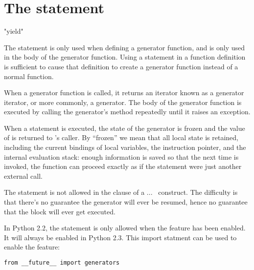 \section{The  statement \label{yield}}

\begin{productionlist}
             {"yield" }
\end{productionlist}


The  statement is only used when defining a generator
function, and is only used in the body of the generator function.
Using a  statement in a function definition is
sufficient to cause that definition to create a generator function
instead of a normal function.

When a generator function is called, it returns an iterator known as a
generator iterator, or more commonly, a generator.  The body of the
generator function is executed by calling the generator's
 method repeatedly until it raises an exception.

When a  statement is executed, the state of the
generator is frozen and the value of  is
returned to 's caller.  By ``frozen'' we mean that all
local state is retained, including the current bindings of local
variables, the instruction pointer, and the internal evaluation stack:
enough information is saved so that the next time  is
invoked, the function can proceed exactly as if the 
statement were just another external call.

The  statement is not allowed in the 
clause of a  ...\  construct.  The
difficulty is that there's no guarantee the generator will ever be
resumed, hence no guarantee that the  block will ever
get executed.

\begin{notice}
In Python 2.2, the  statement is only allowed
when the  feature has been enabled.  It will always
be enabled in Python 2.3.  This  import statment can
be used to enable the feature:

\begin{verbatim}
from __future__ import generators
\end{verbatim}
\end{notice}


